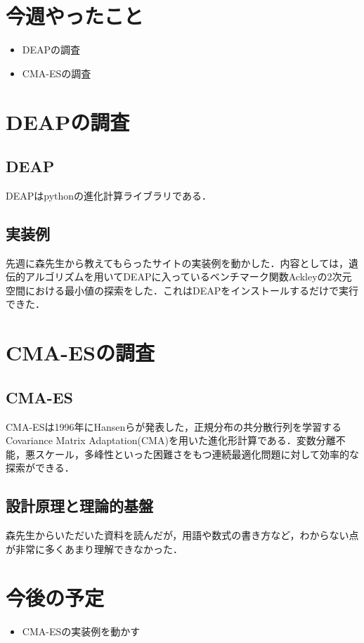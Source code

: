 \documentclass[twocolumn]{jarticle}
\begin{document}


\section{今週やったこと}
\begin{itemize}
  \item DEAPの調査
  \item CMA-ESの調査
\end{itemize}


\section{DEAPの調査}
	\subsection{DEAP}
	DEAP\cite{DEAP_JMLR2012}はpythonの進化計算ライブラリである．

	\subsection{実装例}
	先週に森先生から教えてもらったサイト\cite{deap_url}の実装例を動かした．内容としては，遺伝的アルゴリズムを用いてDEAPに入っているベンチマーク関数Ackleyの2次元空間における最小値の探索をした．これはDEAPをインストールするだけで実行できた．
	
\section{CMA-ESの調査}

	\subsection{CMA-ES}
	CMA-ES\cite{542381}は1996年にHansenらが発表した，正規分布の共分散行列を学習するCovariance Matrix Adaptation(CMA)を用いた進化形計算である．変数分離不能，悪スケール，多峰性といった困難さをもつ連続最適化問題に対して効率的な探索ができる．
	\subsection{設計原理と理論的基盤}
	森先生からいただいた資料\cite{akimoto2016}を読んだが，用語や数式の書き方など，わからない点が非常に多くあまり理解できなかった．

	
\section{今後の予定}

\begin{itemize}
  \item CMA-ESの実装例を動かす
\end{itemize}

\end{document}
